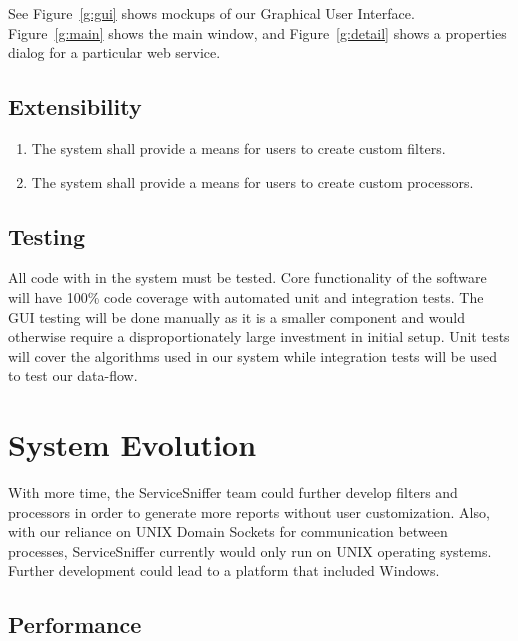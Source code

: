 \documentclass[titlepage]{article}
\begin{document}
See Figure~\ref{g:gui} shows mockups of our Graphical User Interface.
Figure~\ref{g:main} shows the main window, and Figure~\ref{g:detail} shows a
properties dialog for a particular web service.


\subsection{Extensibility%
  \label{extensibility}%
}
\begin{enumerate}
    \item The system shall provide a means for users to create custom filters.
    \item The system shall provide a means for users to create custom processors.
\end{enumerate}

\subsection{Testing%
    \label{testing}%
}
All code with in the system must be tested. Core functionality of the software
will have 100\% code coverage with automated unit and integration tests.  The
GUI testing will be done manually as it is a smaller component and would
otherwise require a disproportionately large investment in initial setup.  Unit
tests will cover the algorithms used in our system while integration tests will
be used to test our data-flow.  

\section{System Evolution}

With more time, the ServiceSniffer team could further develop filters and
processors in order to generate more reports without user customization.  Also,
with our reliance on UNIX Domain Sockets for communication between processes,
ServiceSniffer currently would only run on UNIX operating systems.  Further
development could lead to a platform that included Windows.


\subsection{Performance%
    \label{performance}%
}
\end{document}
